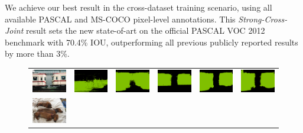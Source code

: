 We achieve our best result in the cross-dataset training scenario,
using all available PASCAL and MS-COCO pixel-level annotations. This
\textsl{Strong-Cross-Joint} result sets the new state-of-art on the
official PASCAL VOC 2012 benchmark with 70.4\% IOU, outperforming all
previous publicly reported results by more than 3\%.

\begin{figure}[p]
  \centering
  \scalebox{0.82} {
  \begin{tabular}{c c c c c c}
    \includegraphics[height=0.11\linewidth]{fig/val_crf_vis/img/2007_000042.jpg} &
    \includegraphics[height=0.11\linewidth]{fig/val_crf_vis/adaweak/2007_000042.png} &
    \includegraphics[height=0.11\linewidth]{fig/val_crf_vis/bbox/2007_000042.png} &
    \includegraphics[height=0.11\linewidth]{fig/val_crf_vis/bbox_crf/2007_000042.png} &
    \includegraphics[height=0.11\linewidth]{fig/val_crf_vis/strongweak/2007_000042.png} &
    \includegraphics[height=0.11\linewidth]{fig/val_crf_vis/cocomix/2007_000042.png} \\
    \includegraphics[height=0.122\linewidth]{fig/val_crf_vis/img/2007_002852.jpg} &

\end{tabular}}
\end{figure}
